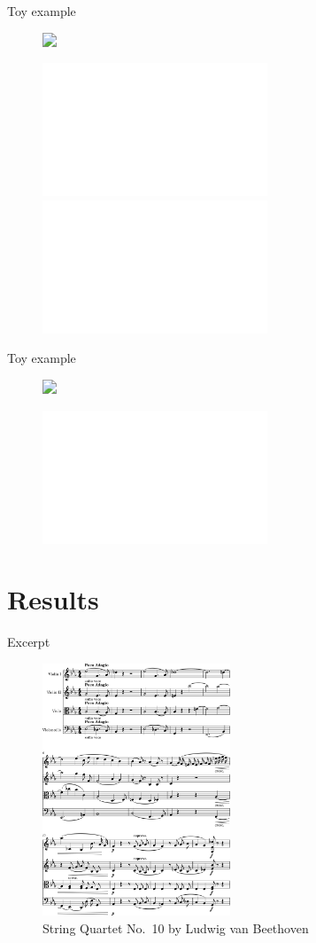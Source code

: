 \documentclass[handout]{beamer}
\begin{document}
\begin{frame}{Toy example}
    \begin{figure}
        \centering
        \includegraphics<1->[width=0.8\textwidth]{../Figures/toy-1.png}
    \end{figure}
    \begin{figure}
        \centering
        \includegraphics<1-2>[width=0.6\textwidth]{../Figures/toy_graph.pdf}
        \includegraphics<2->[width=0.6\textwidth]{../Figures/toy_solution.pdf}
    \end{figure}
\end{frame}

\begin{frame}{Toy example}
    \begin{figure}
        \centering
        \includegraphics<1->[width=0.8\textwidth]{../Figures/toy-1.png}
    \end{figure}
    \begin{figure}
        \centering
        \includegraphics<1->[width=0.6\textwidth]{../Figures/toy_solution.pdf}
    \end{figure}
\end{frame}

\section{Results}

\begin{frame}{Excerpt}
    \begin{figure}
        \centering
        \includegraphics[width=0.5\textwidth]{../Figures/excerpt-1.png}
        \caption{String Quartet No.\ 10 by Ludwig van Beethoven}
    \end{figure}
\end{frame}
\end{document}
